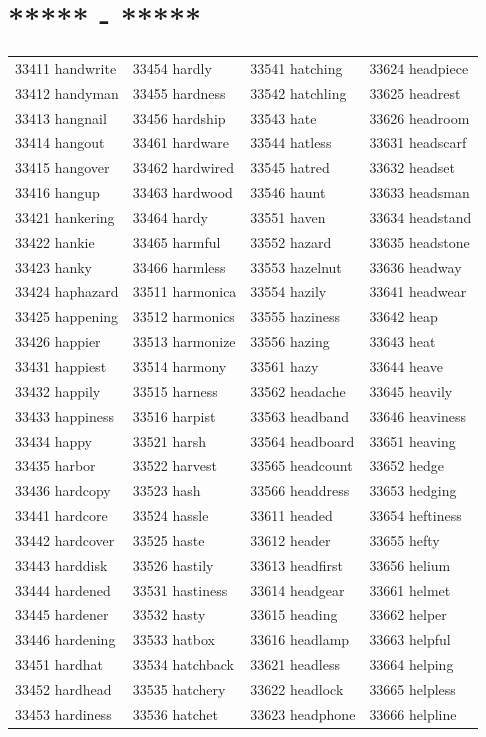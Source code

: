 \documentclass[10pt, oneside]{book}
\begin{document}
\begin{table}[h]
	\centering
	\section*{***** - *****}
	\begin{tabular}{l l l l}
33411 handwrite &33454 hardly &33541 hatching &33624 headpiece\\
33412 handyman &33455 hardness &33542 hatchling &33625 headrest\\
33413 hangnail &33456 hardship &33543 hate &33626 headroom\\
33414 hangout &33461 hardware &33544 hatless &33631 headscarf\\
33415 hangover &33462 hardwired &33545 hatred &33632 headset\\
33416 hangup &33463 hardwood &33546 haunt &33633 headsman\\
33421 hankering &33464 hardy &33551 haven &33634 headstand\\
33422 hankie &33465 harmful &33552 hazard &33635 headstone\\
33423 hanky &33466 harmless &33553 hazelnut &33636 headway\\
33424 haphazard &33511 harmonica &33554 hazily &33641 headwear\\
33425 happening &33512 harmonics &33555 haziness &33642 heap\\
33426 happier &33513 harmonize &33556 hazing &33643 heat\\
33431 happiest &33514 harmony &33561 hazy &33644 heave\\
33432 happily &33515 harness &33562 headache &33645 heavily\\
33433 happiness &33516 harpist &33563 headband &33646 heaviness\\
33434 happy &33521 harsh &33564 headboard &33651 heaving\\
33435 harbor &33522 harvest &33565 headcount &33652 hedge\\
33436 hardcopy &33523 hash &33566 headdress &33653 hedging\\
33441 hardcore &33524 hassle &33611 headed &33654 heftiness\\
33442 hardcover &33525 haste &33612 header &33655 hefty\\
33443 harddisk &33526 hastily &33613 headfirst &33656 helium\\
33444 hardened &33531 hastiness &33614 headgear &33661 helmet\\
33445 hardener &33532 hasty &33615 heading &33662 helper\\
33446 hardening &33533 hatbox &33616 headlamp &33663 helpful\\
33451 hardhat &33534 hatchback &33621 headless &33664 helping\\
33452 hardhead &33535 hatchery &33622 headlock &33665 helpless\\
33453 hardiness &33536 hatchet &33623 headphone &33666 helpline\\
	\end{tabular}
 \end{table}
\end{document}
